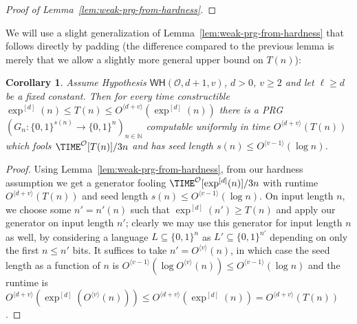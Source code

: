 \documentclass[11pt]{article}
\newtheorem{corollary}{Corollary}
\newcommand{\B}{\{0,1\}}
\newcommand{\od}[1]{O^{\langle #1 \rangle}}
\newcommand{\WH}{\mathsf{WH}}
\begin{document}
\begin{proof}[Proof of Lemma~\ref{lem:weak-prg-from-hardness}]
\end{proof}

We will use a slight generalization of Lemma~\ref{lem:weak-prg-from-hardness} that follows directly by padding (the difference compared to the previous lemma is merely that we allow a slightly more general upper bound on $T(n)$):
\begin{corollary}\label{cor:scaled-weak}
Assume Hypothesis $\WH(\mathcal{O},d+1,v)$, $d> 0$, $v \geq 2$ and let $\ell \geq d$ be a fixed constant. Then for every time constructible $\exp^{[d]}(n)  \leq T(n) \leq \od{d + v}(\exp^{[d]}(n))$ there is a PRG $(G_n: \B^{s(n)} \to \B^n)_{n \in \mathbb{N}}$ computable uniformly in time $\od{d+v}(T(n))$ which fools $\TIME^{\mathcal{O}}[T(n)]/3n $ and has seed length $s(n) \leq \od{v-1}(\log n)$. 
\end{corollary}
\begin{proof}
Using Lemma~\ref{lem:weak-prg-from-hardness}, from our hardness assumption we get a generator fooling $\TIME^\mathcal{O}[\exp^{[d]}(n)]/3n$ with runtime $\od{d+v}(T(n))$ and seed length $s(n) \leq \od{v-1}(\log n)$. On input length $n$, we choose some $n' = n'(n)$ such that $\exp^{[d]}(n') \geq T(n)$ and apply our generator on input length $n'$; clearly we may use this generator for input length $n$ as well, by considering a language $L \subseteq \B^n$ as $L' \subseteq \B^{n'}$ depending on only the first $n \leq n'$ bits. It suffices to take $n' =\od{v}(n)$, in which case the seed length as a function of $n$ is $\od{v-1}(\log \od{v}(n)) \leq \od{v-1}(\log n)$ and the runtime is $\od{d+v}(\exp^{[d]}(\od{v}(n))) \leq \od{d + v}(\exp^{[d]}(n)) = \od{d + v}(T(n))$.
\end{proof}
\end{document}

